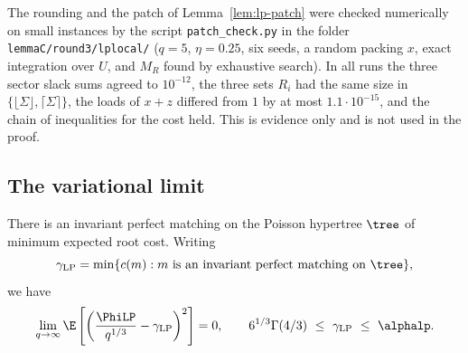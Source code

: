 \begin{remark}\label{rem:lp-check}
The rounding and the patch of Lemma~\ref{lem:lp-patch} were checked numerically on small
instances by the script \texttt{patch\_check.py} in the folder
\texttt{lemmaC/round3/lplocal/} ($q=5$, $\eta=0.25$, six seeds, a random packing $x$, exact integration over $U$, and $M_R$ found by exhaustive
search). In all runs the three sector slack sums agreed to $10^{-12}$, the three sets
$R_i$ had the same size in $\{\lfloor\Sigma\rfloor,\lceil\Sigma\rceil\}$, the loads of $x+z$
differed from $1$ by at most $1.1\cdot10^{-15}$, and the chain of inequalities for the cost
held. This is evidence only and is not used in the proof.
\end{remark}

\subsection{The variational limit}\label{sec:lp-limit}

\begin{theorem}\label{thm:lp-limit}
There is an invariant perfect matching on the Poisson hypertree $\tree$ of minimum
expected root cost. Writing
\[
\gamma_{\mathrm{LP}}=\min\{c(m):m\text{ is an invariant perfect matching on }\tree\},
\]
we have
\[
\lim_{q\to\infty}\E\left[\left(\frac{\PhiLP}{q^{1/3}}-\gamma_{\mathrm{LP}}\right)^2\right]=0,
\qquad
6^{1/3}\Gamma(4/3)\ \le\ \gamma_{\mathrm{LP}}\ \le\ \alphalp .
\]
\end{theorem}


